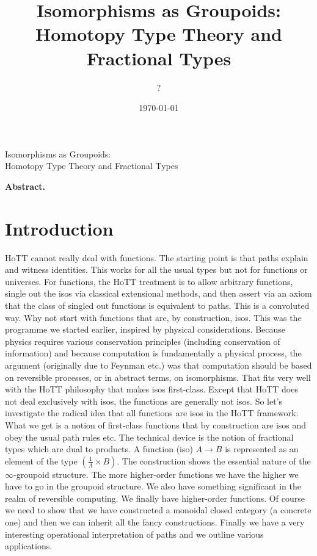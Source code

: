 \documentclass[11pt]{article}
\begin{document}
\begin{titlepage}
\begin{center}
\vfill
{\LARGE Isomorphisms as Groupoids: \\ 
  Homotopy Type Theory and Fractional Types} \\[1.5cm]
\vfill
\end{center}
\vfill
\noindent\textbf{Abstract.} 

\vfill
\vfill
\end{titlepage}

\title{Isomorphisms as Groupoids: \\ 
  Homotopy Type Theory and Fractional Types}
\author{?}
\date{\today}
\maketitle

\section{Introduction}

HoTT cannot really deal with functions. The starting point is that paths
explain and witness identities. This works for all the usual types but not
for functions or universes. For functions, the HoTT treatment is to allow
arbitrary functions, single out the isos via classical extensional methods,
and then assert via an axiom that the class of singled out functions is
equivalent to paths. This is a convoluted way. Why not start with functions
that are, by construction, isos. This was the programme we started earlier,
inspired by physical considerations. Because physics requires various
conservation principles (including conservation of information) and because
computation is fundamentally a physical process, the argument (originally due
to Feynman etc.) was that computation should be based on reversible
processes, or in abstract terms, on isomorphisms. That fits very well with
the HoTT philosophy that makes isos first-class. Except that HoTT does not
deal exclusively with isos, the functions are generally not isos. So let's
investigate the radical idea that all functions are isos in the HoTT
framework. What we get is a notion of first-class functions that by
construction are isos and obey the usual path rules etc. The technical device
is the notion of fractional types which are dual to products. A function
(iso) $A \rightarrow B$ is represented as an element of the type
$(\frac{1}{A} \times B)$. The construction shows the essential nature of the
$\infty$-groupoid structure. The more higher-order functions we have the
higher we have to go in the groupoid structure. We also have something
significant in the realm of reversible computing. We finally have
higher-order functions. Of course we need to show that we have constructed a
monoidal closed category (a concrete one) and then we can inherit all the
fancy constructions. Finally we have a very interesting operational
interpretation of paths and we outline various applications.
\end{document}
